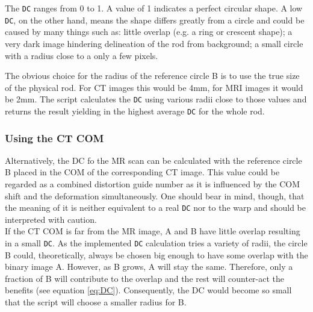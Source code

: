 The \texttt{DC} ranges from 0 to 1.
A value of 1 indicates a perfect circular shape.
A low \texttt{DC}, on the other hand, means the shape differs greatly from a circle and could be caused by many things such as:
little overlap (e.g. a ring or crescent shape); a very dark image hindering delineation of the rod from background; a small circle with a radius close to a only a few pixels.

The obvious choice for the radius of the reference circle B is to use the true size of the physical rod.
For CT images this would be 4mm, for MRI images it would be 2mm.
The script calculates the \texttt{DC} using various radii close to those values and returns the result yielding in the highest average \texttt{DC} for the whole rod.

\subsubsection{Using the CT COM}
Alternatively, the DC fo the MR scan can be calculated with the reference circle B placed in the COM of the corresponding CT image.
This value could be regarded as a combined distortion guide number as it is influenced by the COM shift and the deformation simultaneously.
One should bear in mind, though, that the meaning of it is neither equivalent to a real \texttt{DC} nor to the warp and should be interpreted with caution.\\

If the CT COM is far from the MR image, A and B have little overlap resulting in a small \texttt{DC}.
As the implemented \texttt{DC} calculation tries a variety of radii, the circle B could, theoretically, always be chosen big enough to have some overlap with the binary image A.
However, as B grows, A will stay the same.
Therefore, only a fraction of B will contribute to the overlap and the rest will counter-act the benefits (see equation \ref{eq:DC}).
Consequently, the DC would become so small that the script will choose a smaller radius for B.

